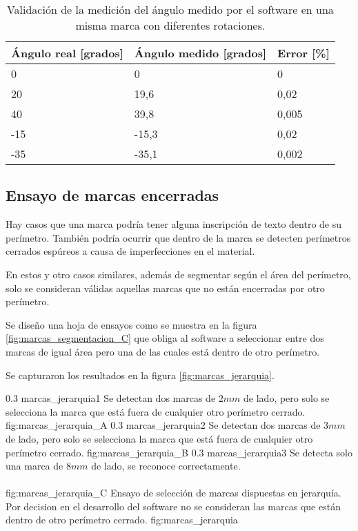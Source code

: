       \begin{table}[!ht]
         \centering
         \caption[Ensayo de medición de ángulos de marcas]{Validación de la medición del ángulo medido por el software en una misma marca con diferentes rotaciones.}
         \begin{tabular}[!ht]{m{1.6cm}m{1.6cm}m{1.6cm}}
            \toprule
            \textbf{Ángulo real [grados]} & \textbf{Ángulo medido [grados]} & \textbf{Error [\%]}\\
            \midrule
            {0}   & {0}     & {0}\\
            {20}  & {19,6}  & {0,02}\\
            {40}  & {39,8}  & {0,005}\\
            {-15} & {-15,3} & {0,02}\\
            {-35} & {-35,1} & {0,002}\\
            \bottomrule
         \end{tabular}
         \label{tbl:marcas_angulos}
      \end{table}

\subsection{Ensayo de marcas encerradas}
\label{subsection:marcas_jerarquias}

Hay casos que una marca podría tener alguna inscripción de texto dentro de su perímetro. También podría ocurrir que dentro de la marca se detecten perímetros cerrados espúreos a causa de imperfecciones en el material.\par
En estos y otro casos similares, además de segmentar según el área del perímetro, solo se consideran válidas aquellas marcas que no están encerradas por otro perímetro. \par
Se diseño una hoja de ensayos como se muestra en la figura \ref{fig:marcas_segmentacion_C} que obliga al software a seleccionar entre dos marcas de igual área pero una de las cuales está dentro de otro perímetro.\par
   Se capturaron los resultados en la figura \ref{fig:marcas_jerarquia}.

   \subfigabc
   {0.3} {marcas_jerarquia1} {Se detectan dos marcas de $2mm$ de lado, pero solo se selecciona la marca que está fuera de cualquier otro perímetro cerrado.} {fig:marcas_jerarquia_A}
   {0.3} {marcas_jerarquia2} {Se detectan dos marcas de $3mm$ de lado, pero solo se selecciona la marca que está fuera de cualquier otro perímetro cerrado.} {fig:marcas_jerarquia_B}
   {0.3} {marcas_jerarquia3} {Se detecta solo una marca de $8mm$ de lado, se reconoce correctamente.\\ \vphantom{1}\\ \vphantom{1}} {fig:marcas_jerarquia_C}
   {Ensayo de selección de marcas dispuestas en jerarquía. Por decision en el desarrollo del software no se consideran las marcas que están dentro de otro perímetro cerrado.}
   {fig:marcas_jerarquia}

